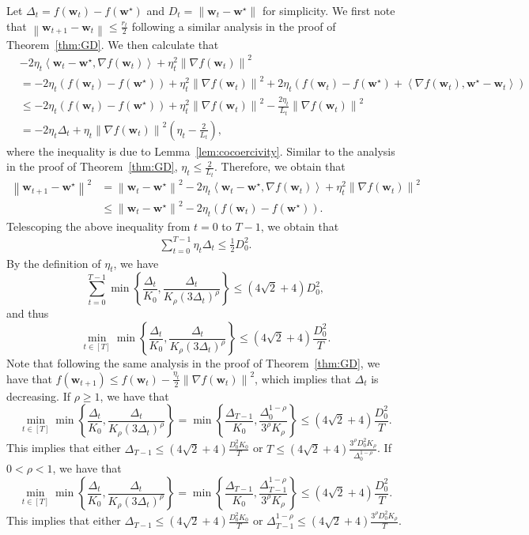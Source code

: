 \documentclass{article}
\newcommand{\Norm}[1]{\left\|#1\right\|}
\newcommand{\dotprod}[2]{\left\langle#1,#2\right\rangle}
\newcommand{\Kr}{K_{\rho}}
\newcommand{\paren}[1]{\left( #1 \right)}
\newcommand{\bw}{\mathbf{w}}
\begin{document}
Let $\Delta_t=f(\bw_t)-f(\bw^\star)$ and $D_t=\Norm{\bw_t-\bw^\star}$ for simplicity. We first note that $\Norm{\bw_{t+1}-\bw_t}\leq \frac{r_t}{2}$ following a similar analysis in the proof of Theorem~\ref{thm:GD}.
We then calculate that
\begin{equation}\nonumber
    \begin{aligned}
        &-2\eta_t\dotprod{\bw_t-\bw^\star}{\nabla f(\bw_t)}+\eta_t^2\Norm{\nabla f(\bw_t)}^2\\
        &=-2\eta_t\paren{f(\bw_t)-f(\bw^\star)}+\eta_t^2\Norm{\nabla f(\bw_t)}^2+2\eta_t\paren{f(\bw_t)-f(\bw^\star)+\dotprod{\nabla f(\bw_t)}{\bw^\star-\bw_t}}\\
        &\leq -2\eta_t\paren{f(\bw_t)-f(\bw^\star)}+\eta_t^2\Norm{\nabla f(\bw_t)}^2-\frac{2\eta_t}{L_t}\Norm{\nabla f(\bw_t)}^2\\
        &=-2\eta_t\Delta_t+\eta_t\Norm{\nabla f(\bw_t)}^2\paren{\eta_t-\frac{2}{L_t}},
    \end{aligned}
\end{equation}
where the inequality is due to Lemma~\ref{lem:cocoercivity}. Similar to the analysis in the proof of Theorem~\ref{thm:GD}, $\eta_t\leq \frac{2}{L_t}$.
Therefore, we obtain that
\begin{align*}
    \Norm{\bw_{t+1}-\bw^\star}^2&=\Norm{\bw_t-\bw^\star}^2-2\eta_t\dotprod{\bw_t-\bw^\star}{\nabla f(\bw_t)}+\eta_t^2\Norm{\nabla f(\bw_t)}^2\\
    &\leq \Norm{\bw_t-\bw^\star}^2-2\eta_t \paren{f(\bw_t)-f(\bw^\star)}.
\end{align*}
Telescoping the above inequality from $t=0$ to $T-1$, we obtain that
\begin{align*}
    \sum_{t=0}^{T-1}\eta_t\Delta_t\leq \frac{1}{2}D_0^2.
\end{align*}
By the definition of $\eta_t$, we have
$$
\sum_{t=0}^{T-1}\min\left\{\frac{\Delta_t}{K_0}, \frac{\Delta_t}{\Kr\paren{3\Delta_t}^\rho}\right\}\leq \paren{4\sqrt{2}+4}D_0^2,
$$
and thus
$$
\min_{t\in[T]}\min\left\{\frac{\Delta_t}{K_0}, \frac{\Delta_t}{\Kr\paren{3\Delta_t}^\rho}\right\}\leq \paren{4\sqrt{2}+4}\frac{D_0^2}{T}.
$$
Note that following the same analysis in the proof of Theorem~\ref{thm:GD}, we have that $f(\bw_{t+1})\leq f(\bw_t)-\frac{\eta_t}{2}\Norm{\nabla f(\bw_t)}^2$, which implies that $\Delta_t$ is decreasing. If $\rho\geq 1$, we have that
$$
\min_{t\in[T]}\min\left\{\frac{\Delta_t}{K_0}, \frac{\Delta_t}{\Kr\paren{3\Delta_t}^\rho}\right\}=\min\left\{\frac{\Delta_{T-1}}{K_0}, \frac{\Delta_{0}^{1-\rho}}{3^\rho\Kr}\right\}\leq \paren{4\sqrt{2}+4}\frac{D_0^2}{T}.
$$
This implies that either $\Delta_{T-1}\leq \paren{4\sqrt{2}+4}\frac{D_0^2 K_0}{T}$ or $T\leq \paren{4\sqrt{2}+4}\frac{3^\rho D_0^2\Kr} {\Delta_0^{1-\rho}}$.
If $0<\rho<1$, we have that
$$
\min_{t\in[T]}\min\left\{\frac{\Delta_t}{K_0}, \frac{\Delta_t}{\Kr\paren{3\Delta_t}^\rho}\right\}=\min\left\{\frac{\Delta_{T-1}}{K_0}, \frac{\Delta_{T-1}^{1-\rho}}{3^\rho\Kr}\right\}\leq \paren{4\sqrt{2}+4}\frac{D_0^2}{T}.
$$
This implies that either $\Delta_{T-1}\leq\paren{4\sqrt{2}+4}\frac{D_0^2K_0}{T}$ or $\Delta_{T-1}^{1-\rho}\leq \paren{4\sqrt{2}+4}\frac{3^\rho D_0^2\Kr}{T}$.
\end{document}
